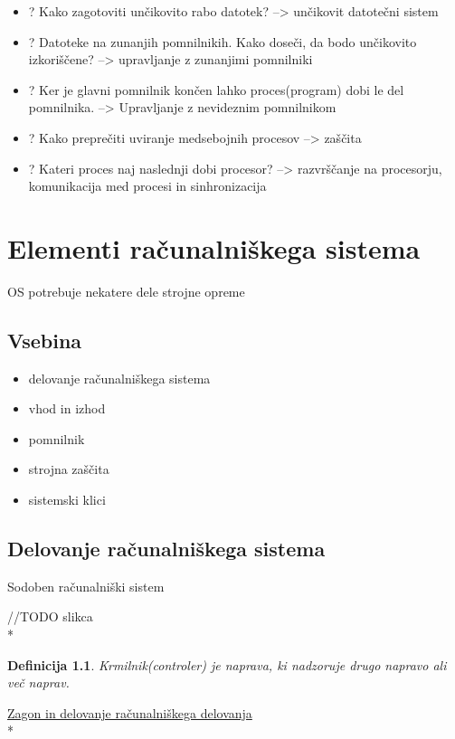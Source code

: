 \documentclass[
  slovene,
  a4paper
]{book}
\newtheorem*{df}{Definicija}
\begin{document}
\begin{itemize}
  \item ? Kako zagotoviti unčikovito rabo datotek? --> unčikovit datotečni sistem
  \item ? Datoteke na zunanjih pomnilnikih. Kako doseči, da bodo unčikovito izkoriščene? --> upravljanje z zunanjimi pomnilniki
  \item ? Ker je glavni pomnilnik končen lahko proces(program) dobi le del pomnilnika. --> Upravljanje z nevideznim pomnilnikom
  \item ? Kako preprečiti uviranje medsebojnih procesov --> zaščita
  \item ? Kateri proces naj naslednji dobi procesor? --> razvrščanje na procesorju, komunikacija med procesi in sinhronizacija
\end{itemize}

\chapter{Elementi računalniškega sistema}

OS potrebuje nekatere dele strojne opreme

\section{Vsebina}

\begin{itemize}
  \item delovanje računalniškega sistema
  \item vhod in izhod
  \item pomnilnik
  \item strojna zaščita
  \item sistemski klici
\end{itemize}

\section{Delovanje računalniškega sistema}

Sodoben računalniški sistem

//TODO slikca\\*

\begin{df}
 Krmilnik(controler) je naprava, ki nadzoruje drugo napravo ali več naprav. 
\end{df}

\underline{Zagon in delovanje računalniškega delovanja}\\*
\end{document}
